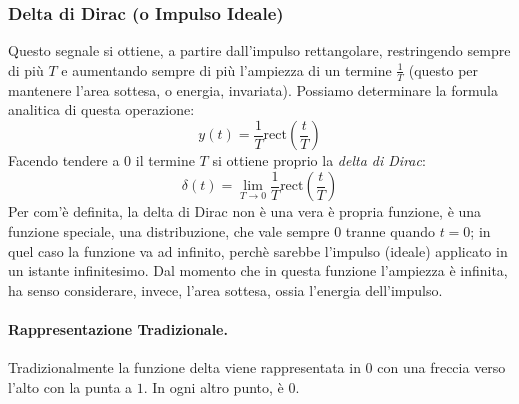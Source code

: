 \subsubsection{Delta di Dirac (o Impulso Ideale)}
Questo segnale si ottiene, a partire dall'impulso rettangolare, restringendo sempre di più $T$ e aumentando sempre di più l'ampiezza di un termine $\frac{1}{T}$ (questo per mantenere l'area sottesa, o energia, invariata).
Possiamo determinare la formula analitica di questa operazione:
\begin{equation*}
    y(t) = \frac{1}{T}\mbox{rect}\left(\frac{t}{T}\right)
\end{equation*}
Facendo tendere a 0 il termine $T$ si ottiene proprio la \textit{delta di Dirac}:
\begin{equation} \label{eq:delta}
    \delta(t) = \lim_{T \rightarrow 0} \frac{1}{T}\mbox{rect}\left(\frac{t}{T}\right)
\end{equation}
Per com'è definita, la delta di Dirac non è una vera è propria funzione, è una funzione speciale, una distribuzione, che vale sempre 0 tranne quando $t = 0$; 
in quel caso la funzione va ad infinito, perchè sarebbe l'impulso (ideale) applicato in un istante infinitesimo.
Dal momento che in questa funzione l'ampiezza è infinita, ha senso considerare, invece, l'area sottesa, ossia l'energia dell'impulso.
\paragraph{Rappresentazione Tradizionale.} Tradizionalmente la funzione delta viene rappresentata in $0$ con una freccia verso l'alto con la punta a $1$. In ogni altro punto, è $0$.
\begin{center}
\end{center}

